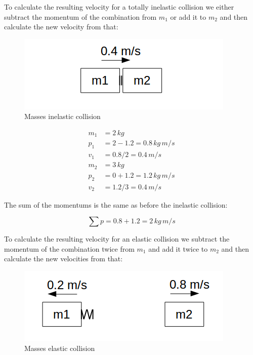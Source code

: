 \documentclass[]{elementary-physics}
\begin{document}
To calculate the resulting velocity for a totally inelastic collision we either subtract the momentum of the combination from $m_1$ or add it to $m_2$ and then calculate the new velocity from that:

\begin{figure}[ht] \centering
	\includegraphics[scale=.5]{mms5} \caption{Masses inelastic collision}
\end{figure}

\begin{subequations}
\begin{align}
m_1 &= 2 \, kg \\
p_1 &= 2 - 1.2 = 0.8 \, kg \, m/s \\
v_1 &= 0.8 / 2 = 0.4 \, m/s \\
m_2 &= 3 \, kg \\
p_2 &= 0 + 1.2 = 1.2 \, kg \, m/s \\
v_2 &= 1.2 / 3 = 0.4 \, m/s
\end{align}
\end{subequations}

The sum of the momentums is the same as before the inelastic collision:

\begin{equation}
\sum p = 0.8 + 1.2 = 2 \, kg \, m/s
\end{equation}

To calculate the resulting velocity for an elastic collision we subtract the momentum of the combination twice from $m_1$ and add it twice to $m_2$ and then calculate the new velocities from that:

\begin{figure}[ht] \centering
	\includegraphics[scale=.5]{mms6} \caption{Masses elastic collision}
\end{figure}
\end{document}
